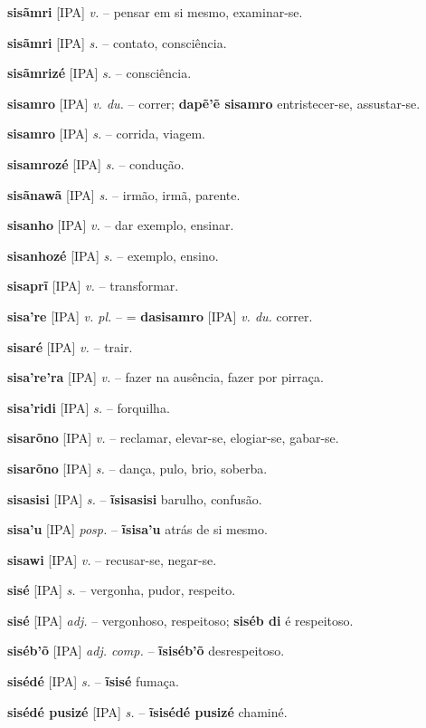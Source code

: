 \textbf{sisãmri} [IPA] \textit{v.} -- pensar em si mesmo, examinar-se.

\textbf{sisãmri} [IPA] \textit{s.} -- contato, consciência.

\textbf{sisãmrizé} [IPA] \textit{s.} -- consciência.

\textbf{sisamro} [IPA] \textit{v. du.} -- correr; \textbf{dapẽ'ẽ sisamro} entristecer-se, assustar-se.

\textbf{sisamro} [IPA] \textit{s.} -- corrida, viagem.

\textbf{sisamrozé} [IPA] \textit{s.} -- condução.

\textbf{sisãnawã} [IPA] \textit{s.} -- irmão, irmã, parente.

\textbf{sisanho} [IPA] \textit{v.} -- dar exemplo, ensinar.

\textbf{sisanhozé} [IPA] \textit{s.} -- exemplo, ensino.

\textbf{sisaprĩ} [IPA] \textit{v.} -- transformar.

\textbf{sisa're} [IPA] \textit{v. pl.} -- = \textbf{dasisamro} [IPA] \textit{v. du.} correr.

\textbf{sisaré} [IPA] \textit{v.} -- trair.

\textbf{sisa're'ra} [IPA] \textit{v.} -- fazer na ausência, fazer por pirraça.

\textbf{sisa'ridi} [IPA] \textit{s.} -- forquilha.

\textbf{sisarõno} [IPA] \textit{v.} -- reclamar, elevar-se, elogiar-se, gabar-se.

\textbf{sisarõno} [IPA] \textit{s.} -- dança, pulo, brio, soberba.

\textbf{sisasisi} [IPA] \textit{s.} -- \textbf{ĩsisasisi} barulho, confusão.

\textbf{sisa'u} [IPA] \textit{posp.} -- \textbf{ĩsisa'u} atrás de si mesmo.

\textbf{sisawi} [IPA] \textit{v.} -- recusar-se, negar-se.

\textbf{sisé} [IPA] \textit{s.} -- vergonha, pudor, respeito.

\textbf{sisé} [IPA] \textit{adj.} -- vergonhoso, respeitoso; \textbf{siséb di} é respeitoso.

\textbf{siséb'õ} [IPA] \textit{adj. comp.} -- \textbf{ĩsiséb'õ} desrespeitoso.

\textbf{sisédé} [IPA] \textit{s.} -- \textbf{ĩsisé} fumaça.

\textbf{sisédé pusizé} [IPA] \textit{s.} -- \textbf{ĩsisédé pusizé} chaminé.

